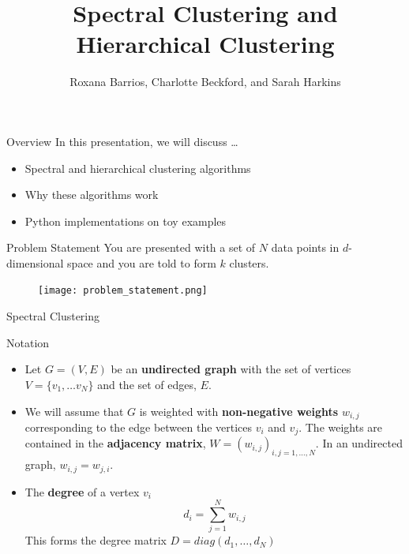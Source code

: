 \documentclass{beamer}
\title[Spectral and Hierarchical Clustering]{Spectral Clustering and Hierarchical Clustering}
\author{Roxana Barrios, Charlotte Beckford, and Sarah Harkins}
\institute{Math 526}
\begin{document}
\begin{frame}
\titlepage
\end{frame}


\begin{frame}{Overview}
    In this presentation, we will discuss \dots
        \begin{itemize}
            \item Spectral and hierarchical clustering algorithms
            \item Why these algorithms work
            \item Python implementations on toy examples 
        \end{itemize}
\end{frame}

\begin{frame}{Problem Statement}
     You are presented with a set of $N$ data points in $d$-dimensional space and you are told to form $k$ clusters.
     \begin{figure}
         \centering
         \texttt{[image: problem\_statement.png]}
     \end{figure}
\end{frame}


\begin{frame}
    \begin{center}
      \textcolor{TennesseeOrange}{\huge Spectral Clustering}  
    \end{center}
\end{frame}

\begin{frame}{Notation}
    \begin{itemize}
        \item Let $G = (V,E)$ be an \textbf{undirected graph} with the set of vertices $V = \{ v_1, \dots v_N\}$ and the set of edges, $E$.  
        \item We will assume that $G$ is weighted with \textbf{non-negative weights} $w_{i,j}$ corresponding to the edge between the vertices $v_i$ and $v_j$. The weights are contained in the \textbf{adjacency matrix}, $W = (w_{i,j})_{i,j = 1, \dots , N}$. In an undirected graph, $w_{i,j} = w_{j,i}$. 
        \item The \textbf{degree} of a vertex $v_i$  $$d_i = \sum_{j=1}^{N} w_{i,j}$$ This forms the degree matrix $D= diag(d_1, \dots , d_N)$
    \end{itemize}  
\end{frame}
\end{document}

